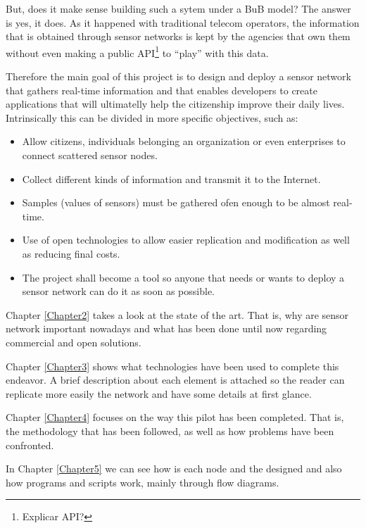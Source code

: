 But, does it make sense building such a sytem under a BuB model? The answer is yes, it does. As it happened with traditional telecom operators, the information that is obtained through sensor networks is kept by the agencies that own them without even making a public API\footnote{Explicar API?} to ``play'' with this data.

Therefore the main goal of this project is to design and deploy a sensor network that gathers real-time information and that enables developers to create applications that will ultimatelly help the citizenship improve their daily lives. Intrinsically this can be divided in more specific objectives, such as:

\begin{itemize}
    \item Allow citizens, individuals belonging an organization or even enterprises to connect scattered sensor nodes.
    \item Collect different kinds of information and transmit it to the Internet.
    \item Samples (values of sensors) must be gathered ofen enough to be almost real-time.
    \item Use of open technologies to allow easier replication and modification as well as reducing final costs.
    \item The project shall become a tool so anyone that needs or wants to deploy a sensor network can do it as soon as possible.
\end{itemize}

Chapter \ref{Chapter2} takes a look at the state of the art. That is, why are sensor network important nowadays and what has been done until now regarding commercial and open solutions.

Chapter \ref{Chapter3} shows what technologies have been used to complete this endeavor. A brief description about each element is attached so the reader can replicate more easily the network and have some details at first glance.

Chapter \ref{Chapter4} focuses on the way this pilot has been completed. That is, the methodology that has been followed, as well as how problems have been confronted.

In Chapter \ref{Chapter5} we can see how is each node and the designed and also how programs and scripts work, mainly through flow diagrams.
